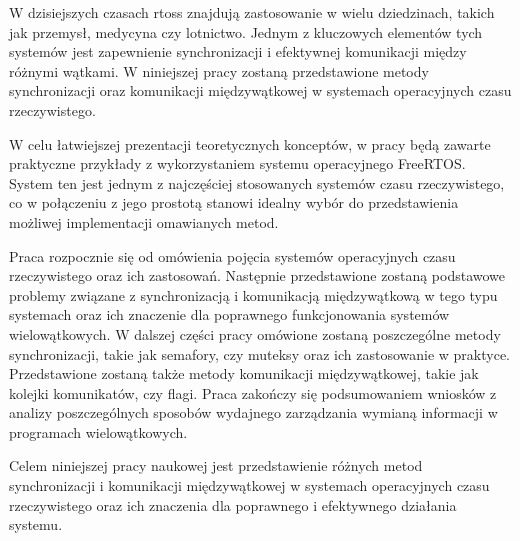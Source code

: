 W dzisiejszych czasach \glspl{rtos} znajdują zastosowanie w wielu dziedzinach,
takich jak przemysł, medycyna czy lotnictwo. Jednym z kluczowych elementów tych systemów jest zapewnienie synchronizacji
i efektywnej komunikacji między różnymi wątkami. W niniejszej pracy zostaną przedstawione
metody synchronizacji oraz komunikacji międzywątkowej w systemach operacyjnych czasu rzeczywistego.

W celu łatwiejszej prezentacji teoretycznych konceptów, w pracy będą zawarte praktyczne przykłady
z wykorzystaniem systemu operacyjnego FreeRTOS. System ten jest jednym z najczęściej stosowanych systemów
czasu rzeczywistego, co w połączeniu z jego prostotą stanowi idealny wybór do przedstawienia
możliwej implementacji omawianych metod.

Praca rozpocznie się od omówienia pojęcia systemów operacyjnych czasu rzeczywistego oraz ich zastosowań.
Następnie przedstawione zostaną podstawowe problemy związane z synchronizacją i komunikacją międzywątkową
w tego typu systemach oraz ich znaczenie dla poprawnego funkcjonowania systemów wielowątkowych.
W dalszej części pracy omówione zostaną poszczególne metody synchronizacji, takie jak semafory, czy muteksy
oraz ich zastosowanie w praktyce. Przedstawione zostaną także metody komunikacji
międzywątkowej, takie jak kolejki komunikatów, czy flagi.
Praca zakończy się podsumowaniem wniosków z analizy poszczególnych sposobów wydajnego zarządzania
wymianą informacji w programach wielowątkowych.

Celem niniejszej pracy naukowej jest przedstawienie różnych metod
synchronizacji i komunikacji międzywątkowej w systemach operacyjnych czasu rzeczywistego oraz ich
znaczenia dla poprawnego i efektywnego działania systemu.
